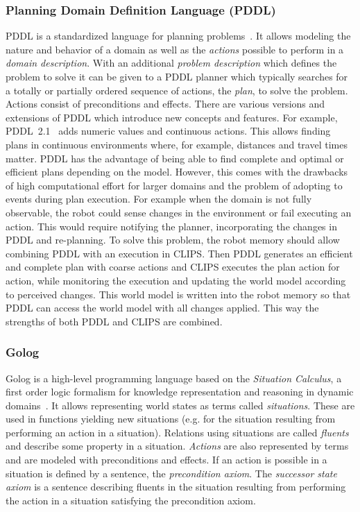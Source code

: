 \documentclass[a4paper,11pt]{article}
\newcommand{\reflst}[1]{Listing~\ref{#1}}
\begin{document}
\subsubsection{Planning Domain Definition Language (PDDL)} PDDL is a
standardized language for planning problems~\cite{PDDL}. It allows
modeling the nature and behavior of a domain as well as the
\emph{actions} possible to perform in a \emph{domain
  description}. With an additional \emph{problem description} which
defines the problem to solve it can be given to a PDDL planner which
typically searches for a totally or partially ordered sequence of actions, the
\emph{plan}, to solve the problem.
Actions consist of preconditions and effects.  There are
various versions and extensions of PDDL which introduce new concepts
and features. For example, PDDL~2.1~\cite{PDDL2.1} adds numeric values and
continuous actions. This allows finding plans in continuous
environments where, for example, distances and travel times
matter. PDDL has the advantage of being able to find complete and
optimal or efficient plans depending on the model. However, this comes with the
drawbacks of high computational effort for larger domains and the
problem of adopting to events during plan execution. For example when
the domain is not fully observable, the robot could sense changes in
the environment or fail executing an action. This would require
notifying the planner, incorporating the changes in PDDL and
re-planning. To solve this problem, the robot memory should allow combining PDDL with an
execution in CLIPS. Then PDDL generates an efficient and complete plan
with coarse actions and CLIPS executes the plan action for action,
while monitoring the execution and updating the world model according
to perceived changes. This world model is written into the robot
memory so that PDDL can access the world model with all changes applied.
This way the strengths of both PDDL and CLIPS are combined.


\subsubsection{Golog} Golog is a high-level programming language based on the
\emph{Situation Calculus}, a first order logic formalism for knowledge
representation and reasoning in dynamic domains~\cite{Golog}. It
allows representing world states as terms called
\emph{situations}. These are used in functions yielding new situations
(e.g. for the situation resulting from performing an action in a
situation). Relations using situations are called \emph{fluents} and
describe some property in a situation. \emph{Actions} are also
represented by terms and are modeled with preconditions and
effects. If an action is possible in a situation is defined by a
sentence, the \emph{precondition axiom}. The \emph{successor state
  axiom} is a sentence describing fluents in the situation resulting
from performing the action in a situation satisfying the precondition
axiom.
\end{document}
